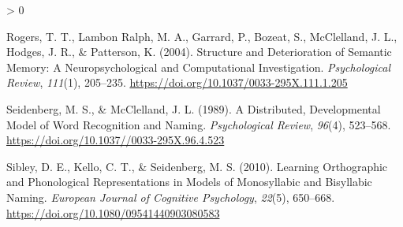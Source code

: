 \documentclass[
  american,
  man,floatsintext]{apa6}
\newlength{\cslhangindent}
\newenvironment{CSLReferences}[2] %
 {%
  \setlength{\parindent}{0pt}
  \ifodd #1 \everypar{\setlength{\hangindent}{\cslhangindent}}\ignorespaces\fi
  \ifnum #2 > 0
  \setlength{\parskip}{#2\baselineskip}
  \fi
 }%
 {}
\begin{document}
\begin{CSLReferences}{1}{0}
\leavevmode\hypertarget{ref-Rogers2004}{}%
Rogers, T. T., Lambon Ralph, M. A., Garrard, P., Bozeat, S., McClelland, J. L., Hodges, J. R., \& Patterson, K. (2004). {Structure and Deterioration of Semantic Memory: A Neuropsychological and Computational Investigation}. \emph{Psychological Review}, \emph{111}(1), 205--235. \url{https://doi.org/10.1037/0033-295X.111.1.205}

\leavevmode\hypertarget{ref-Seidenberg1989}{}%
Seidenberg, M. S., \& McClelland, J. L. (1989). {A Distributed, Developmental Model of Word Recognition and Naming}. \emph{Psychological Review}, \emph{96}(4), 523--568. \url{https://doi.org/10.1037//0033-295X.96.4.523}

\leavevmode\hypertarget{ref-Sibley2010}{}%
Sibley, D. E., Kello, C. T., \& Seidenberg, M. S. (2010). {Learning Orthographic and Phonological Representations in Models of Monosyllabic and Bisyllabic Naming}. \emph{European Journal of Cognitive Psychology}, \emph{22}(5), 650--668. \url{https://doi.org/10.1080/09541440903080583}

\end{CSLReferences}


\clearpage
\renewcommand{\listtablename}{Table captions}
\end{document}
